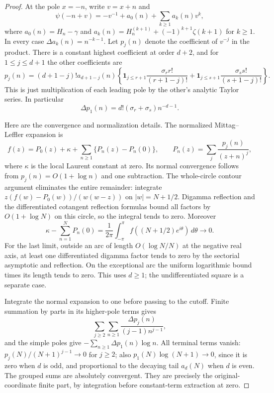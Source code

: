 \documentclass[11pt,a4paper]{article}
\numberwithin{equation}{section}
\theoremstyle{plain}
\theoremstyle{definition}
\theoremstyle{remark}
\begin{document}
\begin{proof}
At the pole $x=-n$, write $v=x+n$ and
\[
 \psi(-n+v)=-v^{-1}+a_0(n)+\sum_{k\ge1}a_k(n)v^k,
\]
where $a_0(n)=H_n-\gamma$ and
$a_k(n)=H_n^{(k+1)}+(-1)^{k+1}\zeta(k+1)$ for $k\ge1$.
In every case $\Delta a_k(n)=n^{-k-1}$.
Let $p_j(n)$ denote the coefficient of $v^{-j}$ in the product.
There is a constant highest coefficient at order $d+2$, and for
$1\le j\le d+1$ the other coefficients are
\begin{equation}\label{dq:bilinearpoles}
 p_j(n)=(d+1-j)!a_{d+1-j}(n)
 \left\{\mathbf1_{j\le r+1}\frac{\sigma_r r!}{(r+1-j)!}
       +\mathbf1_{j\le s+1}\frac{\sigma_s s!}{(s+1-j)!}\right\}.
\end{equation}
This is just multiplication of each leading pole by the other's
analytic Taylor series. In particular
\[
 \Delta p_1(n)=d!(\sigma_r+\sigma_s)n^{-d-1}.
\]

Here are the convergence and normalization details. The normalized
Mittag--Leffler expansion is
\[
 f(z)=P_0(z)+\kappa+
           \sum_{n\ge1}\{P_n(z)-P_n(0)\},\qquad
 P_n(z)=\sum_j\frac{p_j(n)}{(z+n)^j},
\]
where $\kappa$ is the local Laurent constant at zero. Its normal
convergence follows from $p_j(n)=O(1+\log n)$ and one subtraction.
The whole-circle contour argument eliminates the entire remainder:
integrate $z(f(w)-P_0(w))/(w(w-z))$ on $|w|=N+1/2$.
Digamma reflection and the differentiated cotangent reflection formulas
bound all factors by $O(1+\log N)$ on this circle, so the integral
tends to zero. Moreover
\[
 \kappa-\sum_{n=1}^NP_n(0)
       =\frac1{2\pi}\int_{-\pi}^{\pi}f((N+1/2)e^{i\theta})\,d\theta
       \longrightarrow0.
\]
For the last limit, outside an arc of length $O(\log N/N)$ at the
negative real axis, at least one differentiated digamma factor tends
to zero by the sectorial asymptotic and reflection. On the exceptional
arc the uniform logarithmic bound times its length tends to zero.
This uses $d\ge1$; the undifferentiated square is a separate case.

Integrate the normal expansion to one before passing to the cutoff.
Finite summation by parts in its higher-pole terms gives
\[
 \sum_{j\ge2}\sum_{n\ge1}
              \frac{\Delta p_j(n)}{(j-1)n^{j-1}},
\]
and the simple poles give $-\sum_{n\ge1}\Delta p_1(n)\log n$.
All terminal terms vanish: $p_j(N)/(N+1)^{j-1}\to0$ for $j\ge2$;
also $p_1(N)\log(N+1)\to0$, since it is zero when $d$ is odd,
and proportional to the decaying tail $a_d(N)$ when $d$ is even.
The grouped sums are absolutely convergent. They are precisely the
original-coordinate finite part, by integration before constant-term
extraction at zero.


\end{proof}
\end{document}
